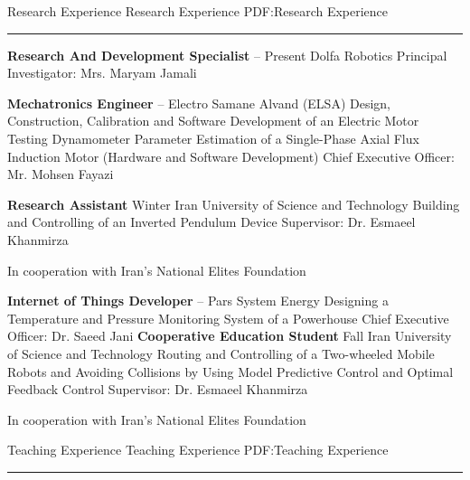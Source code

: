 \documentclass[letterpaper,MMMyyyy,nonstopmode]{ResumeTemplate}
\begin{document}
\begin{Body}
\Section
{Research Experience}
{Research Experience}
{PDF:Research Experience}
\textcolor{Forestg}{\vspace{0.05cm}\hrule height 0.1cm}\BigGap
\Entry
\vspace{5pt}
\textbf{Research And Development Specialist}
\hfill
{} – Present
\Gap
\BulletItem
Dolfa Robotics
\SubBulletItem
Principal Investigator: Mrs. Maryam Jamali

\Entry
\vspace{5pt}
\textbf{Mechatronics Engineer}
\hfill
{} – 
\Gap
\BulletItem
Electro Samane Alvand (ELSA)
\SubBulletItem
Design, Construction, Calibration and Software Development of an Electric Motor Testing Dynamometer 
\SubBulletItem
Parameter Estimation of a Single-Phase Axial Flux Induction Motor (Hardware and Software Development) 
\SubBulletItem
Chief Executive Officer: Mr. Mohsen Fayazi


\Entry
\vspace{5pt}
\textbf{Research Assistant}
\hfill
Winter 
\Gap
\BulletItem
Iran University of Science and Technology
\SubBulletItem
Building and Controlling of an Inverted Pendulum Device
\SubBulletItem
Supervisor: Dr. Esmaeel Khanmirza
\begin{Detail}
	\qquad In cooperation with Iran's National Elites Foundation
\end{Detail}


\Entry
\vspace{5pt}
\textbf{Internet of Things Developer}
\hfill
{} –
\Gap
\BulletItem
Pars System Energy
\SubBulletItem
Designing a Temperature and Pressure Monitoring System of a Powerhouse
\SubBulletItem
Chief Executive Officer: Dr. Saeed Jani
\Entry
\vspace{5pt}
\textbf{Cooperative Education Student}
\hfill
Fall 
\Gap
\BulletItem
Iran University of Science and Technology
\SubBulletItem
Routing and Controlling of a Two-wheeled Mobile Robots and Avoiding Collisions by Using Model Predictive Control and Optimal Feedback Control
\SubBulletItem
Supervisor: Dr. Esmaeel Khanmirza
\begin{Detail}
	\qquad In cooperation with Iran's National Elites Foundation
\end{Detail}



\Section
{Teaching Experience}
{Teaching Experience}
{PDF:Teaching Experience}
\textcolor{Forestg}{\vspace{0.05cm}\hrule height 0.1cm}\BigGap


\end{Body}
\end{document}
